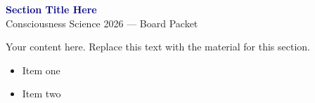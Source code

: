 \documentclass[11pt,letterpaper]{article}
\begin{document}
\begin{center}
{\Large\bfseries\textcolor{navy}{Section Title Here}}\\[6pt]
{\normalsize Consciousness Science 2026 --- Board Packet}
\end{center}

\bigskip


Your content here. Replace this text with the material for this section.

\begin{itemize}
  \item Item one
  \item Item two
\end{itemize}

\end{document}
